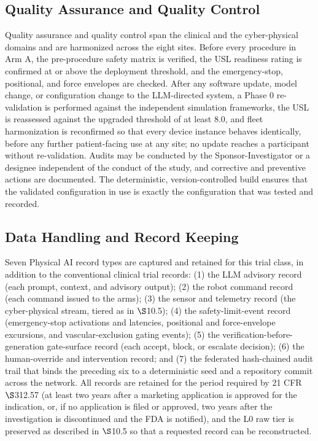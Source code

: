 \subsection{Quality Assurance and Quality Control}

Quality assurance and quality control span the clinical and the cyber-physical
domains and are harmonized across the eight sites. Before every procedure in Arm A,
the pre-procedure safety matrix is verified, the USL readiness rating is confirmed at
or above the deployment threshold, and the emergency-stop, positional, and force
envelopes are checked. After any software update, model change, or configuration
change to the LLM-directed system, a Phase 0 re-validation is performed against the
independent simulation frameworks, the USL is reassessed against the upgraded
threshold of at least 8.0, and fleet harmonization is reconfirmed so that every
device instance behaves identically, before any further patient-facing use at any
site; no update reaches a participant without re-validation. Audits may be conducted
by the Sponsor-Investigator or a designee independent of the conduct of the study,
and corrective and preventive actions are documented. The deterministic,
version-controlled build ensures that the validated configuration in use is exactly
the configuration that was tested and recorded.

\subsection{Data Handling and Record Keeping}

Seven Physical AI record types are captured and retained for this trial class, in
addition to the conventional clinical trial records: (1) the LLM advisory record
(each prompt, context, and advisory output); (2) the robot command record (each
command issued to the arms); (3) the sensor and telemetry record (the
cyber-physical stream, tiered as in $\S$10.5); (4) the safety-limit-event record
(emergency-stop activations and latencies, positional and force-envelope
excursions, and vascular-exclusion gating events); (5) the
verification-before-generation gate-surface record (each accept, block, or escalate
decision); (6) the human-override and intervention record; and (7) the federated
hash-chained audit trail that binds the preceding six to a deterministic seed and a
repository commit across the network. All records are retained for the period
required by 21 CFR $\S$312.57 (at least two years after a marketing application is
approved for the indication, or, if no application is filed or approved, two years
after the investigation is discontinued and the FDA is notified), and the L0 raw
tier is preserved as described in $\S$10.5 so that a requested record can be
reconstructed.

